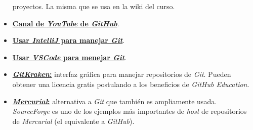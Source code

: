 \begin{itemize}
        proyectos.
        La misma que se usa en la wiki del curso. 
      \item \href{https://www.youtube.com/githubguides}{\textbf{Canal de 
        \textit{YouTube} de \textit{GitHub}}}.
      \item \href{https://www.youtube.com/watch?v=uUzRMOCBorg}{\textbf{Usar 
        \textit{IntelliJ} para manejar \textit{Git}}}.
      \item  \href{https://code.visualstudio.com/docs/editor/versioncontrol}{
        \textbf{Usar \textit{VSCode} para menejar \textit{Git}}}.
      \item \href{https://www.gitkraken.com}{\textbf{\textit{GitKraken}:}} interfaz 
        gráfica para manejar repositorios de \textit{Git}.
        Pueden obtener una licencia gratis postulando a los beneficios de 
        \textit{GitHub Education}.
      \item \href{https://www.mercurial-scm.org}{\textbf{\textit{Mercurial}:}} 
        alternativa a \textit{Git} que también es ampliamente usada.
        \textit{SourceForge} es uno de los ejemplos más importantes de \textit{host} 
        de repositorios de \textit{Mercurial} (el equivalente a \textit{GitHub}).
    \end{itemize}
%